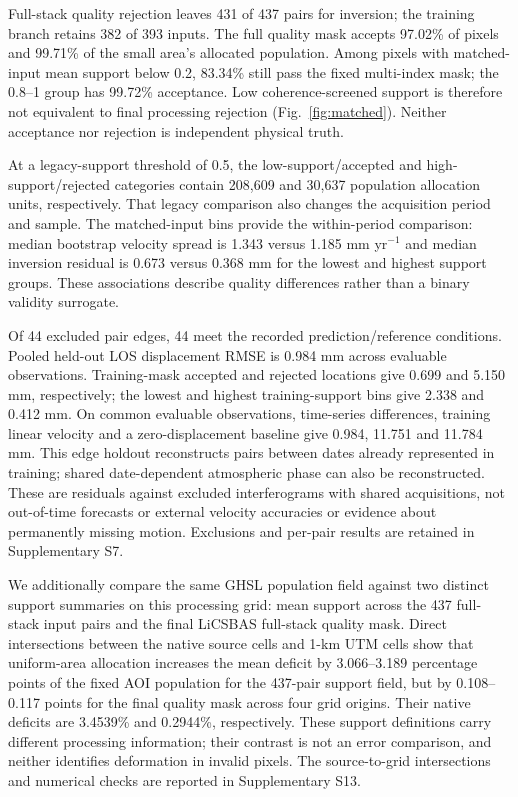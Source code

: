 Full-stack quality rejection leaves 431 of 437 pairs for inversion; the training branch retains 382 of 393 inputs. The full quality mask accepts 97.02\% of pixels and 99.71\% of the small area's allocated population. Among pixels with matched-input mean support below 0.2, 83.34\% still pass the fixed multi-index mask; the 0.8--1 group has 99.72\% acceptance. Low coherence-screened support is therefore not equivalent to final processing rejection (Fig.~\ref{fig:matched}). Neither acceptance nor rejection is independent physical truth.

At a legacy-support threshold of 0.5, the low-support/accepted and high-support/rejected categories contain 208,609 and 30,637 population allocation units, respectively. That legacy comparison also changes the acquisition period and sample. The matched-input bins provide the within-period comparison: median bootstrap velocity spread is 1.343 versus 1.185 mm yr$^{-1}$ and median inversion residual is 0.673 versus 0.368 mm for the lowest and highest support groups. These associations describe quality differences rather than a binary validity surrogate.

Of 44 excluded pair edges, 44 meet the recorded prediction/reference conditions. Pooled held-out LOS displacement RMSE is 0.984 mm across evaluable observations. Training-mask accepted and rejected locations give 0.699 and 5.150 mm, respectively; the lowest and highest training-support bins give 2.338 and 0.412 mm. On common evaluable observations, time-series differences, training linear velocity and a zero-displacement baseline give 0.984, 11.751 and 11.784 mm. This edge holdout reconstructs pairs between dates already represented in training; shared date-dependent atmospheric phase can also be reconstructed. These are residuals against excluded interferograms with shared acquisitions, not out-of-time forecasts or external velocity accuracies or evidence about permanently missing motion. Exclusions and per-pair results are retained in Supplementary S7.

We additionally compare the same GHSL population field against two distinct support summaries on this processing grid: mean support across the 437 full-stack input pairs and the final LiCSBAS full-stack quality mask. Direct intersections between the native source cells and 1-km UTM cells show that uniform-area allocation increases the mean deficit by 3.066--3.189 percentage points of the fixed AOI population for the 437-pair support field, but by 0.108--0.117 points for the final quality mask across four grid origins. Their native deficits are 3.4539\% and 0.2944\%, respectively. These support definitions carry different processing information; their contrast is not an error comparison, and neither identifies deformation in invalid pixels. The source-to-grid intersections and numerical checks are reported in Supplementary S13.

